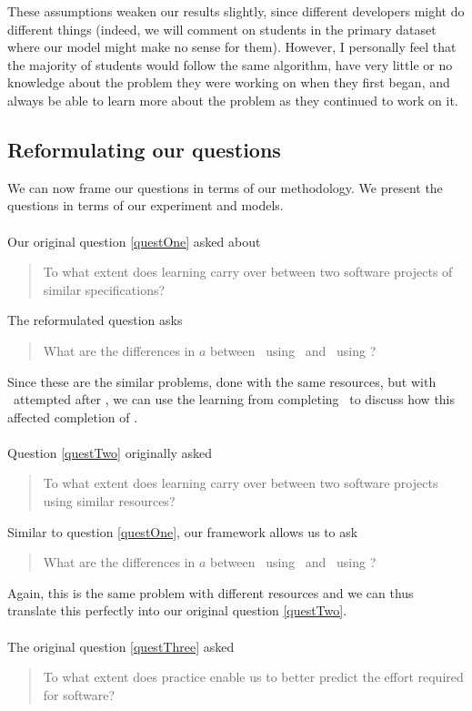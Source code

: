 These assumptions weaken our results slightly, since different developers might
do different things (indeed, we will comment on students in the primary
dataset where our model might make no sense for them).
However, I personally feel that the majority of students would follow the same
algorithm, have very little or no knowledge about the problem they were working
on when they first began, and always be able to learn more about the problem as
they continued to work on it.

\subsection{Reformulating our questions} \label{subsecReform}

We can now frame our questions in terms of our methodology.
We present the questions in terms of our experiment and models.\\
\\
Our original question \ref{questOne} asked about 
\begin{quote}
  To what extent does learning carry over between two software projects of similar
  specifications?
\end{quote}

The reformulated question asks
\begin{quote}
  What are the differences in $a$ between \PO\ using \LA\ and \PT\ using \LA?
\end{quote}\label{qq1}

Since these are the similar problems, done with the same resources, but with
\PO\ attempted after \PT, we can use the learning from completing \PO\ to
discuss how this affected completion of \PT.\\
\\
Question \ref{questTwo} originally asked
\begin{quote}
  To what extent does learning carry over between two software projects using
  similar resources?
\end{quote}

Similar to question \ref{questOne}, our framework allows us to ask
\begin{quote}
   What are the differences in $a$ between \PO\ using \LA\ and \PO\ using
  \LB?
\end{quote} \label{qq2}

Again, this is the same problem with different resources and we can thus
translate this perfectly into our original question \ref{questTwo}.\\
\\
The original question \ref{questThree} asked
\begin{quote}
  To what extent does practice enable us to better predict the effort required
  for software?
\end{quote}

